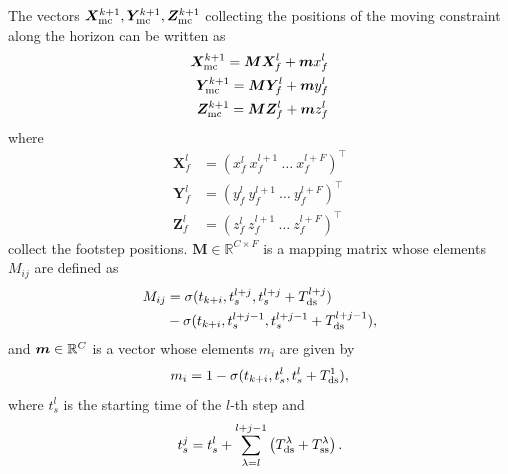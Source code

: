 The vectors $\bm{X}_{\rm mc}^{k+1}, \bm{Y}_{\rm mc}^{k+1}, \bm{Z}_{\rm mc}^{k+1}$
collecting the positions of the moving constraint along the horizon
can be written as
\begin{equation}
    \begin{aligned}
        \bm{X}_{\rm mc}^{k+1} = \bm{M} \bm{X}_f^l + \bm{m}x_f^l \\
        \bm{Y}_{\rm mc}^{k+1} = \bm{M} \bm{Y}_f^l + \bm{m}y_f^l \\
        \bm{Z}_{\rm mc}^{k+1} = \bm{M} \bm{Z}_f^l + \bm{m}z_f^l
    \end{aligned}
    \label{eq:FAPA:mapping}
\end{equation}
where
\begin{equation*}
    \begin{aligned}
        \bm{X}_{f}^{l} &= (x_{f}^{l} \ x_{f}^{l+1} \ \dots \ x_{f}^{l+F})^\top \\
        \bm{Y}_{f}^{l} &= (y_{f}^{l} \ y_{f}^{l+1} \ \dots \ y_{f}^{l+F})^\top \\
        \bm{Z}_{f}^{l} &= (z_{f}^{l} \ z_{f}^{l+1} \ \dots \ z_{f}^{l+F})^\top
    \end{aligned}
\end{equation*}
collect the footstep positions.
$\bm{M}\in\mathbb{R}^{C\times F}$ is a mapping matrix whose elements
$M_{ij}$ are defined as
\begin{equation}\begin{split}
M_{ij} &= \sigma(t_{k+i}, t_s^{l+j},t_s^{l+j}+T_{\rm ds}^{l+j})\\ &- \sigma(t_{k+i}, t_s^{l+j-1},t_s^{l+j-1}+T_{\rm ds}^{l+j-1}),
\end{split}\end{equation}
and ${\bm{m}}\in\mathbb{R}^{C}$ is a vector whose elements $m_i$ are given by
\begin{equation*}
m_{i} = 1 - \sigma(t_{k+i}, t_s^{l},t_s^{l}+T_{\rm ds}^{1}),
\end{equation*}
where $t_s^l$ is the starting time of the $l$-th step and
\begin{equation*}
    t^j_s = t^l_s + \sum^{l+j-1}_{\lambda=l} \left(T_{\rm ds}^\lambda + T_{\rm ss}^\lambda\right).
\end{equation*}


